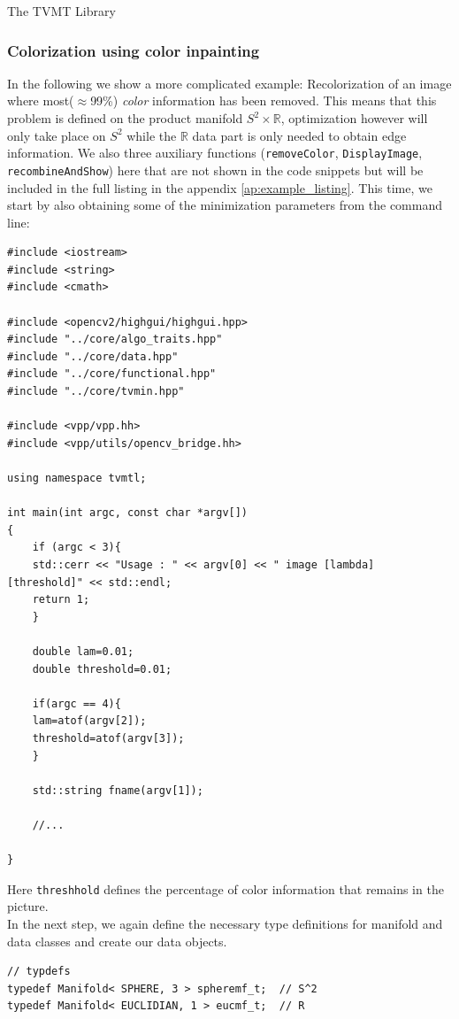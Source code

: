 \begin{chapter}{The TVMT Library}
\subsubsection{Colorization using color inpainting} %
\label{ssub:Color inpainting}
In the following we show a more complicated example: Recolorization of an image where most($\approx$99\%) \textit{color} information has been removed. This means that this
problem is defined on the product manifold $S^2\times \mathbb{R}$, optimization however will only take place on $S^2$ while the $\mathbb{R}$ data part is only needed to obtain
edge information. We also three auxiliary functions (\texttt{removeColor}, \texttt{DisplayImage}, \texttt{recombineAndShow}) here that are not shown in the code snippets but
will be included in the full listing in the appendix \ref{ap:example_listing}. This time, we start by also obtaining some of the minimization parameters from the command line:\\

\cppinline
\begin{lstlisting}[label=code:tut2_init,caption={Include library files and read parameters from standard input}]
#include <iostream>
#include <string>
#include <cmath>

#include <opencv2/highgui/highgui.hpp>
#include "../core/algo_traits.hpp"
#include "../core/data.hpp"
#include "../core/functional.hpp"
#include "../core/tvmin.hpp"

#include <vpp/vpp.hh>
#include <vpp/utils/opencv_bridge.hh>

using namespace tvmtl;

int main(int argc, const char *argv[])
{
    if (argc < 3){
	std::cerr << "Usage : " << argv[0] << " image [lambda] [threshold]" << std::endl;
	return 1;
    }

    double lam=0.01;
    double threshold=0.01;

    if(argc == 4){
	lam=atof(argv[2]);
	threshold=atof(argv[3]);
    }   

    std::string fname(argv[1]);

    //...

}
\end{lstlisting}
Here \texttt{threshhold} defines the percentage of color information that remains in the picture.\\
In the next step, we again define the necessary type definitions for manifold and data classes and create our data objects.

\cppinline
\begin{lstlisting}[label=code:tut2_mfdata,caption={Manifold and Data class type definitions and instantiation}]
// typdefs
typedef Manifold< SPHERE, 3 > spheremf_t;  // S^2
typedef Manifold< EUCLIDIAN, 1 > eucmf_t;  // R
 

\end{lstlisting}
\end{chapter}
